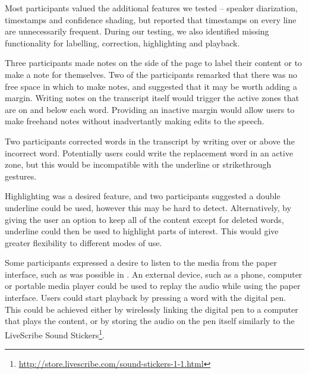 Most participants valued the additional features we tested -- speaker diarization, timestamps and confidence shading,
but reported that timestamps on every line are unnecessarily frequent. During our testing, we also identified missing
functionality for labelling, correction, highlighting and playback.


Three participants made notes on the side of the page to label their content or to make a note for themselves. Two of
the participants remarked that there was no free space in which to make notes, and suggested that it may be worth
adding a margin. Writing notes on the transcript itself would trigger the active zones that are on and below each word.
Providing an inactive margin would allow users to make freehand notes without inadvertantly making edits to the speech.

Two participants corrected words in the transcript by writing over or above the incorrect word. 
Potentially users could write the replacement word in an active zone, but this would be incompatible with the underline
or strikethrough gestures.

Highlighting was a desired feature, and two participants suggested a double underline could be used, however this may
be hard to detect. Alternatively, by giving the user an option to keep all of the content except for deleted words,
underline could then be used to highlight parts of interest.  This would give greater flexibility to different modes of
use.

Some participants expressed a desire to listen to the media from the paper interface, such as was possible in
\citet{Fouse2011}.  An external device, such as a phone, computer or portable media player could be used to replay the
audio while using the paper interface.  Users could start playback by pressing a word with the digital pen. This could
be achieved either by wirelessly linking the digital pen to a computer that plays the content, or by storing the audio
on the pen itself similarly to the LiveScribe Sound
Stickers\footnote{\url{http://store.livescribe.com/sound-stickers-1-1.html}}.

